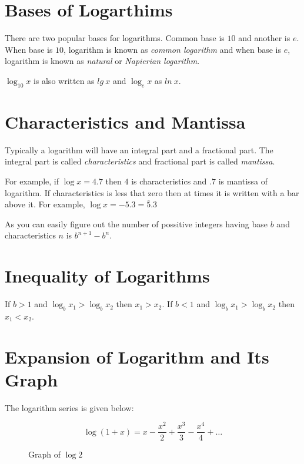 \section{Bases of Logarthims}
There are two popular bases for logarithms. Common base is $10$ and another is $e$. When base is $10$, logarithm is known as
\textit{common logarithm} and when base is $e$, logarithm is known as \textit{natural} or \textit{Napierian logarithm}.

$\log_{10}x$ is also written as $lg~x$ and $\log_ex$ as $ln~x$.

\section{Characteristics and Mantissa}
Typically a logarithm will have an integral part and a fractional part. The integral part is called \textit{characteristics} and
fractional part is called \textit{mantissa}.

For example, if $\log x = 4.7$ then $4$ is characteristics and $.7$ is mantissa of logarithm. If characteristics is less that zero
then at times it is written with a bar above it. For example, $\log x=-5.3=\overline{5}.3$

As you can easily figure out the number of possitive integers having base $b$ and characteristics $n$ is $b^{n + 1} - b^n$.

\section{Inequality of Logarithms}
If $b > 1$ and $\log_bx_1 > \log_bx_2$ then $x_1 > x_2$. If $b < 1$ and $\log_bx_1 > \log_bx_2$ then $x_1 < x_2$.

\section{Expansion of Logarithm and Its Graph}
The logarithm series is given below:

$$\log(1 + x) = x - \frac{x^2}{2} + \frac{x^3}{3} - \frac{x^4}{4} + \ldots$$

\begin{figure}[H]
\begin{center}
  \caption{Graph of $\log 2$}
\end{center}
\end{figure}

